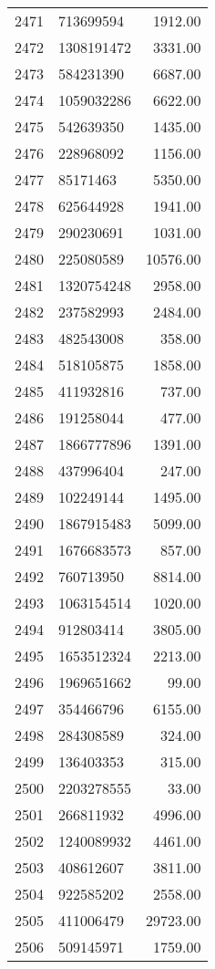\begin{table}[ht]
\begin{tabular}{rlr}
  2471 & 713699594 & 1912.00 \\ 
  2472 & 1308191472 & 3331.00 \\ 
  2473 & 584231390 & 6687.00 \\ 
  2474 & 1059032286 & 6622.00 \\ 
  2475 & 542639350 & 1435.00 \\ 
  2476 & 228968092 & 1156.00 \\ 
  2477 & 85171463 & 5350.00 \\ 
  2478 & 625644928 & 1941.00 \\ 
  2479 & 290230691 & 1031.00 \\ 
  2480 & 225080589 & 10576.00 \\ 
  2481 & 1320754248 & 2958.00 \\ 
  2482 & 237582993 & 2484.00 \\ 
  2483 & 482543008 & 358.00 \\ 
  2484 & 518105875 & 1858.00 \\ 
  2485 & 411932816 & 737.00 \\ 
  2486 & 191258044 & 477.00 \\ 
  2487 & 1866777896 & 1391.00 \\ 
  2488 & 437996404 & 247.00 \\ 
  2489 & 102249144 & 1495.00 \\ 
  2490 & 1867915483 & 5099.00 \\ 
  2491 & 1676683573 & 857.00 \\ 
  2492 & 760713950 & 8814.00 \\ 
  2493 & 1063154514 & 1020.00 \\ 
  2494 & 912803414 & 3805.00 \\ 
  2495 & 1653512324 & 2213.00 \\ 
  2496 & 1969651662 & 99.00 \\ 
  2497 & 354466796 & 6155.00 \\ 
  2498 & 284308589 & 324.00 \\ 
  2499 & 136403353 & 315.00 \\ 
  2500 & 2203278555 & 33.00 \\ 
  2501 & 266811932 & 4996.00 \\ 
  2502 & 1240089932 & 4461.00 \\ 
  2503 & 408612607 & 3811.00 \\ 
  2504 & 922585202 & 2558.00 \\ 
  2505 & 411006479 & 29723.00 \\ 
  2506 & 509145971 & 1759.00 \\ 

\end{tabular}
\end{table}
